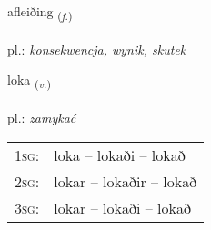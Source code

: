 \documentclass[frontgrid, backgrid]{flacards}\usepackage[]{graphicx}\usepackage[]{xcolor}
\begin{document}
\renewcommand{\flhead}{\vskip5pt \fboxsep=0pt {\small\bfseries\footnotesize Nafnorð | rzeczownik}}
\renewcommand{\fcfoot}{\vskip5pt \fboxsep=0pt \hspace{2pt}{\small\bfseries\footnotesize 1K}}

\renewcommand{\blhead}{\vskip5pt {\small\bfseries\footnotesize Nafnorð | rzeczownik }}
\renewcommand{\bcfoot}{\vskip5pt \hspace{2pt}{\small\bfseries\footnotesize 1K}}


{afleiðing \small{\textsubscript{(\textit{f.})}} \\[1ex] %
\textphonetic{[avleiðiŋk]} \\
pl.: \emph{konsekwencja, wynik, skutek} \\  [2ex]
\renewcommand*{\arraystretch}{0.8}
}

\renewcommand{\flhead}{\vskip5pt \fboxsep=0pt {\small\bfseries\footnotesize Sagnorð | czasownik}}
\renewcommand{\fcfoot}{\vskip5pt \fboxsep=0pt \hspace{2pt}{\small\bfseries\footnotesize 1K}}

\renewcommand{\blhead}{\vskip5pt {\small\bfseries\footnotesize Sagnorð | czasownik }}
\renewcommand{\bcfoot}{\vskip5pt \hspace{2pt}{\small\bfseries\footnotesize 1K}}


{loka \small{\textsubscript{(\textit{v.})}} \\[1ex] %
\textphonetic{[lɔːka]} \\
pl.: \emph{zamykać} \\  [2ex]
\renewcommand*{\arraystretch}{0.8}
\begin{tabular}{p{1cm}l}
\textsc{1sg}: & loka -- lokaði -- lokað \\ 
\textsc{2sg}: & lokar -- lokaðir -- lokað \\ 
\textsc{3sg}: & lokar -- lokaði -- lokað \\ 
\end{tabular}
}
\end{document}
